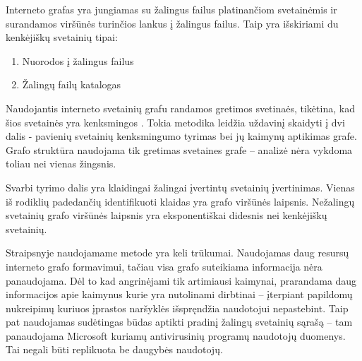 Interneto grafas yra jungiamas su žalingus failus platinančiom svetainėmis ir surandamos viršūnės turinčios lankus į žalingus failus.
Taip yra išskiriami du kenkėjiškų svetainių tipai:
\begin{enumerate}[label=\alph*]
    \item Nuorodos į žalingus failus
    \item Žalingų failų katalogas
\end{enumerate}
Naudojantis interneto svetainių grafu randamos gretimos svetinaės, tikėtina, kad šios svetainės yra kenksmingos \cite{webcop}.
Tokia metodika leidžia uždavinį skaidyti į dvi dalis - pavienių svetainių kenksmingumo tyrimas bei jų kaimynų aptikimas grafe.
Grafo struktūra naudojama tik gretimas svetaines grafe -- analizė nėra vykdoma toliau nei vienas žingsnis.

Svarbi \cite{webcop} tyrimo dalis yra klaidingai žalingai įvertintų svetainių įvertinimas. Vienas iš rodiklių
padedančių identifikuoti klaidas yra grafo viršūnės laipsnis. Nežalingų svetainių grafo viršūnės laipsnis yra
eksponentiškai didesnis nei kenkėjiškų svetainių.

Straipsnyje \cite{webcop} naudojamame metode yra keli trūkumai. Naudojamas daug resursų interneto grafo formavimui,
tačiau visa grafo suteikiama informacija nėra panaudojama. Dėl to kad angrinėjami tik artimiausi kaimynai, prarandama
daug informacijos apie kaimynus kurie yra nutolinami dirbtinai -- įterpiant papildomų nukreipimų kuriuos įprastos
naršyklės išspręndžia naudotojui nepastebint. Taip pat naudojamas sudėtingas būdas aptikti pradinį žalingų svetainių
sąrašą -- tam panaudojama Microsoft kuriamų antivirusinių programų naudotojų duomenys.
Tai negali būti replikuota be daugybės naudotojų.


\newpage